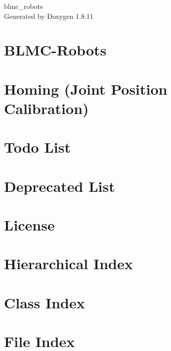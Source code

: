 \documentclass[twoside]{book}
\newcommand{\+}{\discretionary{\mbox{\scriptsize$\hookleftarrow$}}{}{}}
\newcommand{\clearemptydoublepage}{%
  \newpage{\pagestyle{empty}\cleardoublepage}%
}
\begin{document}
\hypersetup{pageanchor=false,
             bookmarksnumbered=true,
             pdfencoding=unicode
            }
\begin{titlepage}
\vspace*{7cm}
\begin{center}%
{\Large blmc\+\_\+robots }\\
\vspace*{1cm}
{\large Generated by Doxygen 1.8.11}\\
\end{center}
\end{titlepage}
\clearemptydoublepage
\tableofcontents
\clearemptydoublepage
{}
\hypersetup{pageanchor=true}

\chapter{B\+L\+M\+C-\/\+Robots}
\label{index}\hypertarget{index}{}
\chapter{Homing (Joint Position Calibration)}
\label{homing}
\hypertarget{homing}{}

\chapter{Todo List}
\label{todo}
\hypertarget{todo}{}

\chapter{Deprecated List}
\label{deprecated}
\hypertarget{deprecated}{}

\chapter{License}
\label{license}
\hypertarget{license}{}

\chapter{Hierarchical Index}

\chapter{Class Index}

\chapter{File Index}

\end{document}
